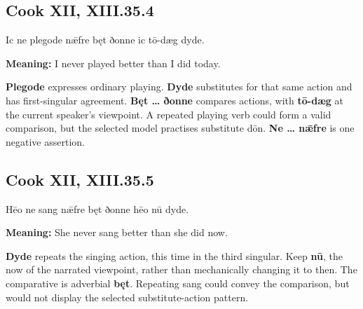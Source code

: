\par\begin{minipage}{\linewidth}\raggedright
\subsection*{Cook XII, XIII.35.4}

Ic ne plegode nǣfre bęt ðonne ic tō-dæg dyde.

\textbf{Meaning:} I never played better than I did today.

\textbf{Plegode} expresses ordinary playing. \textbf{Dyde} substitutes for that same action and has first-singular agreement. \textbf{Bęt … ðonne} compares actions, with \textbf{tō-dæg} at the current speaker’s viewpoint. A repeated playing verb could form a valid comparison, but the selected model practises substitute dōn. \textbf{Ne … nǣfre} is one negative assertion.

\end{minipage}\par\addvspace{4pt}

\par\begin{minipage}{\linewidth}\raggedright
\subsection*{Cook XII, XIII.35.5}

Hēo ne sang nǣfre bęt ðonne hēo nū dyde.

\textbf{Meaning:} She never sang better than she did now.

\textbf{Dyde} repeats the singing action, this time in the third singular. Keep \textbf{nū}, the now of the narrated viewpoint, rather than mechanically changing it to then. The comparative is adverbial \textbf{bęt}. Repeating sang could convey the comparison, but would not display the selected substitute-action pattern.

\end{minipage}\par\addvspace{4pt}

